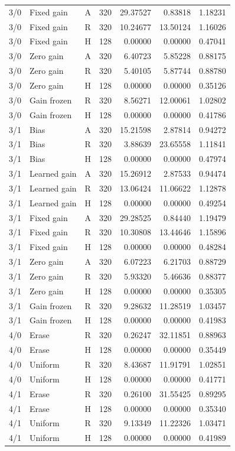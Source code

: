 \begin{longtable}{rlllrrr}
3/0 & Fixed gain & A & 320 & 29.37527 & 0.83818 & 1.18231 \\
3/0 & Fixed gain & R & 320 & 10.24677 & 13.50124 & 1.16026 \\
3/0 & Fixed gain & H & 128 & 0.00000 & 0.00000 & 0.47041 \\
3/0 & Zero gain & A & 320 & 6.40723 & 5.85228 & 0.88175 \\
3/0 & Zero gain & R & 320 & 5.40105 & 5.87744 & 0.88780 \\
3/0 & Zero gain & H & 128 & 0.00000 & 0.00000 & 0.35126 \\
3/0 & Gain frozen & R & 320 & 8.56271 & 12.00061 & 1.02802 \\
3/0 & Gain frozen & H & 128 & 0.00000 & 0.00000 & 0.41786 \\
3/1 & Bias & A & 320 & 15.21598 & 2.87814 & 0.94272 \\
3/1 & Bias & R & 320 & 3.88639 & 23.65558 & 1.11841 \\
3/1 & Bias & H & 128 & 0.00000 & 0.00000 & 0.47974 \\
3/1 & Learned gain & A & 320 & 15.26912 & 2.87533 & 0.94474 \\
3/1 & Learned gain & R & 320 & 13.06424 & 11.06622 & 1.12878 \\
3/1 & Learned gain & H & 128 & 0.00000 & 0.00000 & 0.49254 \\
3/1 & Fixed gain & A & 320 & 29.28525 & 0.84440 & 1.19479 \\
3/1 & Fixed gain & R & 320 & 10.30808 & 13.44646 & 1.15896 \\
3/1 & Fixed gain & H & 128 & 0.00000 & 0.00000 & 0.48284 \\
3/1 & Zero gain & A & 320 & 6.07223 & 6.21703 & 0.88729 \\
3/1 & Zero gain & R & 320 & 5.93320 & 5.46636 & 0.88377 \\
3/1 & Zero gain & H & 128 & 0.00000 & 0.00000 & 0.35305 \\
3/1 & Gain frozen & R & 320 & 9.28632 & 11.28519 & 1.03457 \\
3/1 & Gain frozen & H & 128 & 0.00000 & 0.00000 & 0.41983 \\
4/0 & Erase & R & 320 & 0.26247 & 32.11851 & 0.88963 \\
4/0 & Erase & H & 128 & 0.00000 & 0.00000 & 0.35449 \\
4/0 & Uniform & R & 320 & 8.43687 & 11.91791 & 1.02851 \\
4/0 & Uniform & H & 128 & 0.00000 & 0.00000 & 0.41771 \\
4/1 & Erase & R & 320 & 0.26100 & 31.55425 & 0.89295 \\
4/1 & Erase & H & 128 & 0.00000 & 0.00000 & 0.35340 \\
4/1 & Uniform & R & 320 & 9.13349 & 11.22326 & 1.03471 \\
4/1 & Uniform & H & 128 & 0.00000 & 0.00000 & 0.41989 \\
\bottomrule
\end{longtable}

